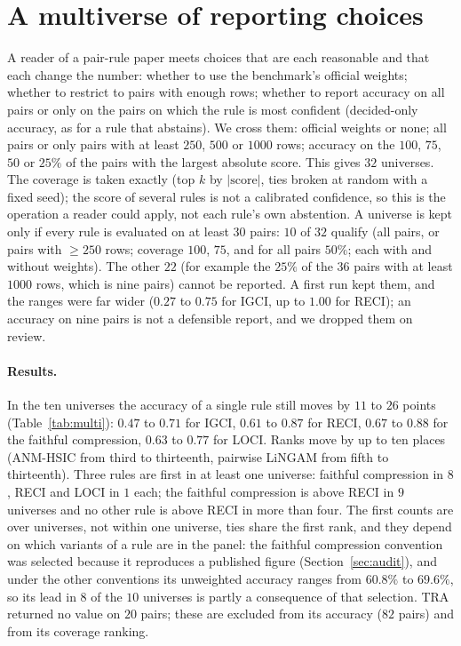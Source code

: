 \section{A multiverse of reporting choices}\label{sec:multi}

A reader of a pair-rule paper meets choices that are each reasonable and that each change the number: whether to use the benchmark's official weights; whether to restrict to pairs with enough rows; whether to report accuracy on all pairs or only on the pairs on which the rule is most confident (decided-only accuracy, as for a rule that abstains). We cross them: official weights or none; all pairs or only pairs with at least $250$, $500$ or $1000$ rows; accuracy on the $100$, $75$, $50$ or $25\%$ of the pairs with the largest absolute score. This gives $32$ universes. The coverage is taken exactly (top $k$ by $|\mathrm{score}|$, ties broken at random with a fixed seed); the score of several rules is not a calibrated confidence, so this is the operation a reader could apply, not each rule's own abstention. A universe is kept only if every rule is evaluated on at least $30$ pairs: $10$ of $32$ qualify (all pairs, or pairs with $\ge 250$ rows; coverage $100$, $75$, and for all pairs $50\%$; each with and without weights). The other $22$ (for example the $25\%$ of the $36$ pairs with at least $1000$ rows, which is nine pairs) cannot be reported. A first run kept them, and the ranges were far wider ($0.27$ to $0.75$ for IGCI, up to $1.00$ for RECI); an accuracy on nine pairs is not a defensible report, and we dropped them on review.

\paragraph{Results.} In the ten universes the accuracy of a single rule still moves by $11$ to $26$ points (Table~\ref{tab:multi}): $0.47$ to $0.71$ for IGCI, $0.61$ to $0.87$ for RECI, $0.67$ to $0.88$ for the faithful compression, $0.63$ to $0.77$ for LOCI. Ranks move by up to ten places (ANM-HSIC from third to thirteenth, pairwise LiNGAM from fifth to thirteenth). Three rules are first in at least one universe: faithful compression in $8$, RECI and LOCI in $1$ each; the faithful compression is above RECI in $9$ universes and no other rule is above RECI in more than four. The first counts are over universes, not within one universe, ties share the first rank, and they depend on which variants of a rule are in the panel: the faithful compression convention was selected because it reproduces a published figure (Section~\ref{sec:audit}), and under the other conventions its unweighted accuracy ranges from $60.8\%$ to $69.6\%$, so its lead in $8$ of the $10$ universes is partly a consequence of that selection. TRA returned no value on $20$ pairs; these are excluded from its accuracy ($82$ pairs) and from its coverage ranking.

